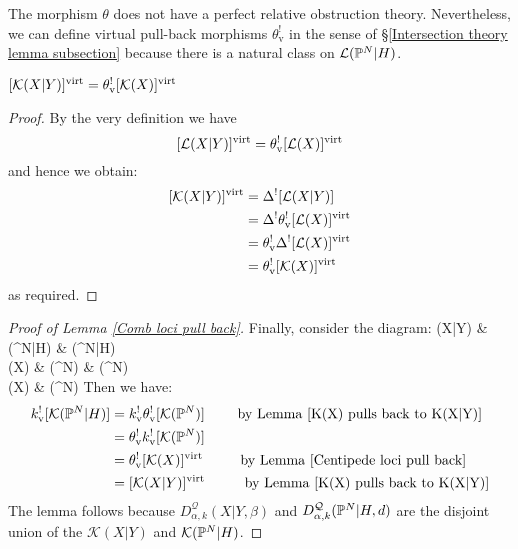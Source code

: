 The morphism $\theta$ does not have a perfect relative obstruction theory. Nevertheless, we can define virtual pull-back morphisms $\theta_{\text{v}}^!$ in the sense of \S \ref{Intersection theory lemma subsection} because there is a natural class on $\mathcal{L}(\mathbb P^N|H)$. 

\begin{lemma} \label{K(X) pulls back to K(X|Y)} $[\mathcal{K}(X|Y)]^{\operatorname{virt}} = \theta_{\text{v}}^![\mathcal{K}(X)]^{\operatorname{virt}}$ \end{lemma}
\begin{proof}
By the very definition we have
\begin{equation*} [\mathcal{L}(X|Y)]^{\operatorname{virt}} = \theta_{\text{v}}^! [\mathcal{L}(X)]^{\operatorname{virt}} \end{equation*}
and hence we obtain:
\begin{align*} [\mathcal{K}(X|Y)]^{\operatorname{virt}} & = \Delta^! [\mathcal{L}(X|Y)]\\
& = \Delta^! \theta_{\text{v}}^! [\mathcal{L}(X)]^{\operatorname{virt}} \\
& = \theta_{\text{v}}^! \Delta^! [\mathcal{L}(X)]^{\operatorname{virt}} \\
& = \theta_{\text{v}}^! [\mathcal{K}(X)]^{\operatorname{virt}} \end{align*}
as required.
\end{proof}

\begin{proof}[Proof of Lemma \ref{Comb loci pull back}]
Finally, consider the diagram:
\bcd
{}(X|Y) \ar[r] \ar[d]  & (\PP^N|H) \ar[r] \ar[d]  & (\PP^N|H) \ar[d,"\theta"] \\
(X) \ar[r] \ar[d]  & (\PP^N) \ar[r] \ar[d] & (\PP^N) \\
(X) \ar[r,"k"] & (\PP^N)
\ecd
Then we have:
\begin{align*} k_{\text{v}}^! [ \mathcal{K}(\mathbb P^N|H) ] & = k_{\text{v}}^! \theta_{\text{v}}^! [ \mathcal{K}(\mathbb P^N) ] \text{\qquad \ by Lemma \ref{K(X) pulls back to K(X|Y)}} \\
& = \theta_{\text{v}}^! k_{\text{v}}^! [ \mathcal{K}(\mathbb P^N) ] \\
& = \theta_{\text{v}}^! [\mathcal{K}(X)]^{\operatorname{virt}} \text{\ \ \qquad by Lemma \ref{Centipede loci pull back}} \\
& = [\mathcal{K}(X|Y)]^{\operatorname{virt}} \text{\qquad \ \, by Lemma \ref{K(X) pulls back to K(X|Y)}}
\end{align*}
The lemma follows because $D^\mathcal{Q}_{\alpha,k}(X|Y,\beta)$ and $D^\mathcal{Q}_{\alpha,k}(\mathbb P^N|H,d)$ are the disjoint union of the $\mathcal{K}(X|Y)$ and $\mathcal{K}(\mathbb P^N|H)$. \end{proof}

